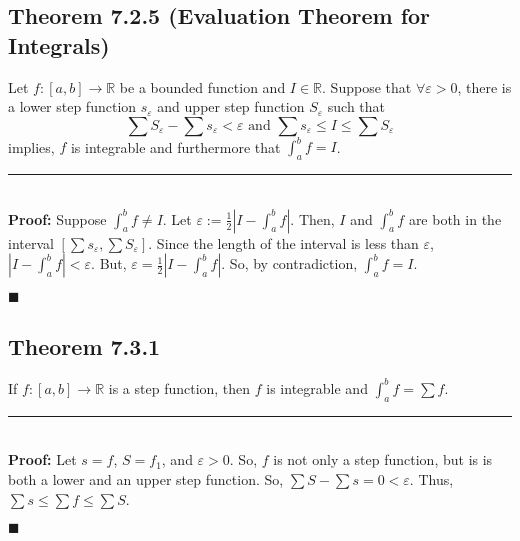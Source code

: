 \documentclass[11pt]{book}
\newcommand{\R}{\mathbb{R}}
\newcommand{\horline}{\noindent\rule{14.25cm}{0.6pt}\\}
\newcommand{\QED}{\begin{flushright}$\blacksquare$\end{flushright}}
\begin{document}
		\subsection{Theorem 7.2.5 (Evaluation Theorem for Integrals)}
		\label{subsec:theor725}
			\begin{theor}
				Let $f:[a,b] \to \R$ be a bounded function and $I \in \R$. Suppose that $\forall \varepsilon > 0$, there is a lower step function $s_{\varepsilon}$ and upper step 
				function $S_{\varepsilon}$ such that 
				$$\sum{S_{\varepsilon}} - \sum{s_{\varepsilon}} < \varepsilon \text{ and } \sum{s_{\varepsilon}} \leq I \leq \sum{S_{\varepsilon}}$$
				implies, $f$ is integrable and furthermore that $\int_a^b{f} = I$.\hfill\break
				\horline
				\textbf{Proof:} Suppose $\int_a^b{f} \neq I$. Let $\varepsilon := \frac{1}{2}|I - \int_a^b{f}|$. Then, $I$ and $\int_a^b{f}$ are both in the interval 
				$[\sum{s_{\varepsilon}}, \sum{S_{\varepsilon}}]$. Since the length of the interval is less than $\varepsilon$, $|I - \int_a^b{f}| < \varepsilon$. But, 
				$\varepsilon = \frac{1}{2}|I - \int_a^b{f}|$. So, by contradiction, $\int_a^b{f} = I$.
				\QED
			\end{theor}

		\subsection{Theorem 7.3.1}
		\label{subsec:theor731}
			\begin{theor}
				If $f:[a,b] \to \R$ is a step function, then $f$ is integrable and $\int_a^b{f} = \sum{f}$. \hfill\break
				\horline
				\textbf{Proof:} Let $s = f$, $S = f_1$, and $\varepsilon > 0$. So, $f$ is not only a step function, but is is both a lower and an upper step function. So, 
				$\sum{S} - \sum{s} = 0 < \varepsilon$. Thus, $\sum{s} \leq \sum{f} \leq \sum{S}$. 
				\QED
			\end{theor}
\end{document}
